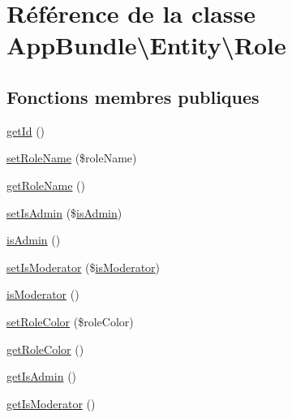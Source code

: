 \hypertarget{classAppBundle_1_1Entity_1_1Role}{}\section{Référence de la classe App\+Bundle\textbackslash{}Entity\textbackslash{}Role}
\label{classAppBundle_1_1Entity_1_1Role}
\subsection*{Fonctions membres publiques}
\begin{DoxyCompactItemize}
\item 
\hyperlink{classAppBundle_1_1Entity_1_1Role_ab30a055916446a86d21cbc622e29b91e}{get\+Id} ()
\item 
\hyperlink{classAppBundle_1_1Entity_1_1Role_a89328bdf2bb14c5c3f75bdafc2c26349}{set\+Role\+Name} (\$role\+Name)
\item 
\hyperlink{classAppBundle_1_1Entity_1_1Role_a421af5d35ceb62acd31c63645a092022}{get\+Role\+Name} ()
\item 
\hyperlink{classAppBundle_1_1Entity_1_1Role_a45fa2f158f13af1b3ccc5673075b814e}{set\+Is\+Admin} (\$\hyperlink{classAppBundle_1_1Entity_1_1Role_a288a7e5a21441f16a3ff077b37b27602}{is\+Admin})
\item 
\hyperlink{classAppBundle_1_1Entity_1_1Role_a288a7e5a21441f16a3ff077b37b27602}{is\+Admin} ()
\item 
\hyperlink{classAppBundle_1_1Entity_1_1Role_a82ea08d642dbfd8b35c0053e44b43ad3}{set\+Is\+Moderator} (\$\hyperlink{classAppBundle_1_1Entity_1_1Role_a659892168df4ecc1e6f447c297045240}{is\+Moderator})
\item 
\hyperlink{classAppBundle_1_1Entity_1_1Role_a659892168df4ecc1e6f447c297045240}{is\+Moderator} ()
\item 
\hyperlink{classAppBundle_1_1Entity_1_1Role_a9384e7e7881d3aac98361beb52dbbf6b}{set\+Role\+Color} (\$role\+Color)
\item 
\hyperlink{classAppBundle_1_1Entity_1_1Role_a09a2aeb58c083be3986f9dd823b7a1af}{get\+Role\+Color} ()
\item 
\hyperlink{classAppBundle_1_1Entity_1_1Role_a1c6633761909eb4de1c9bf91c4b739ff}{get\+Is\+Admin} ()
\item 
\hyperlink{classAppBundle_1_1Entity_1_1Role_a75e0500956054de38ff8729244986b4a}{get\+Is\+Moderator} ()
\end{DoxyCompactItemize}


